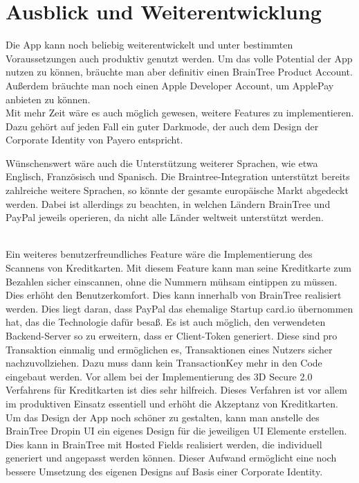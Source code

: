 
\chapter{Ausblick und Weiterentwicklung}

Die App kann noch beliebig weiterentwickelt und unter bestimmten Voraussetzungen auch produktiv genutzt werden.
Um das volle Potential der App nutzen zu können, bräuchte man aber definitiv einen BrainTree Product Account.
Außerdem bräuchte man noch einen Apple Developer Account, um ApplePay anbieten zu können.\\
Mit mehr Zeit wäre es auch möglich gewesen, weitere Features zu implementieren.
Dazu gehört auf jeden Fall ein guter Darkmode, der auch dem Design der Corporate Identity von \glqq Payero\grqq{} entspricht.

Wünschenswert wäre auch die Unterstützung weiterer Sprachen, wie etwa Englisch, Französisch und Spanisch.
Die Braintree-Integration unterstützt bereits zahlreiche weitere Sprachen, so könnte der gesamte europäische Markt abgedeckt werden. Dabei ist allerdings zu beachten, in welchen Ländern BrainTree und PayPal jeweils operieren, da nicht alle Länder weltweit unterstützt werden.

\\
Ein weiteres benutzerfreundliches Feature wäre die Implementierung des Scannens von Kreditkarten.
Mit diesem Feature kann man seine Kreditkarte zum Bezahlen sicher einscannen, ohne die Nummern mühsam eintippen zu müssen.
Dies erhöht den Benutzerkomfort.
Dies kann innerhalb von BrainTree realisiert werden.
Dies liegt daran, dass PayPal das ehemalige Startup card.io übernommen hat, das die Technologie dafür besaß.
Es ist auch möglich, den verwendeten Backend-Server so zu erweitern, dass er Client-Token generiert.
Diese sind pro Transaktion einmalig und ermöglichen es, Transaktionen eines Nutzers sicher nachzuvollziehen.
Dazu muss dann kein TransactionKey mehr in den Code eingebaut werden.
Vor allem bei der Implementierung des 3D Secure 2.0 Verfahrens für Kreditkarten ist dies sehr hilfreich.
Dieses Verfahren ist vor allem im produktiven Einsatz essentiell und erhöht die Akzeptanz von Kreditkarten.
Um das Design der App noch schöner zu gestalten, kann man anstelle des BrainTree Dropin UI ein eigenes Design für die jeweiligen UI Elemente erstellen.
Dies kann in BrainTree mit Hosted Fields realisiert werden, die individuell generiert und angepasst werden können.
Dieser Aufwand ermöglicht eine noch bessere Umsetzung des eigenen Designs auf Basis einer Corporate Identity.
